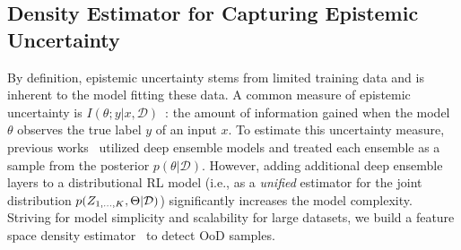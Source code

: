\documentclass{article}
\newcommand{\datapoint}{x}
\newcommand{\state}{s}
\newcommand{\action}{a}
\newcommand{\agentIndex}{k}
\newcommand{\dataset}{\mathcal{D}}
\begin{document}



\subsection{Density Estimator for Capturing Epistemic Uncertainty}\label{subsec:epistemic-uncertainty}
By definition, epistemic uncertainty stems from limited training data and is inherent to the model fitting these data. A common measure of epistemic uncertainty is $I(\theta; y|\datapoint,\dataset)$~\cite{Smith2018Uncertainty,Amersfoort2020Uncertainty,Mukhoti2021Uncertainty}: the amount of information gained when the model $\theta$ observes the true label $y$ of an input $\datapoint$.
To estimate this uncertainty measure, previous works~\cite{Lakshminarayanan2017Ensembles,Wen2020BatchEnsemble,Dusenberry2020Bayesian} utilized deep ensemble models and treated each ensemble as a sample from the posterior $p(\theta|\dataset)$. However, adding additional deep ensemble layers to a distributional RL model (i.e., as a {\it unified} estimator for the joint distribution $p(Z_{1,\dots,\MakeUppercase{\agentIndex}},\Theta|\dataset)$) significantly increases the model complexity. Striving for model simplicity and scalability for large datasets,  we build a feature space density estimator~\cite{Mukhoti2021Uncertainty} to detect OoD samples. 
\end{document}
